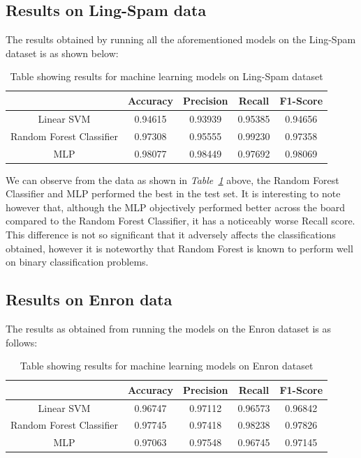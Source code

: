 \documentclass[11pt, a4paper]{article}
\begin{document}
\subsection{Results on Ling-Spam data}

The results obtained by running all the aforementioned models on the Ling-Spam dataset is as shown below:\\
\begin{table}[!h]
\centering
\begin{tabular}{c c c c c}
 & Accuracy & Precision & Recall & F1-Score\\
\hline
Linear SVM & 0.94615 & 0.93939 & 0.95385 & 0.94656\\
\hline 
Random Forest Classifier & 0.97308 & 0.95555 & 0.99230 & 0.97358\\
\hline
MLP & 0.98077 & 0.98449 & 0.97692 & 0.98069\\
\hline
\end{tabular}
\caption{Table showing results for machine learning models on Ling-Spam dataset}
\label{table:lingspam}
\end{table}

We can observe from the data as shown in \emph{Table~\ref{table:lingspam}} above, the Random Forest Classifier and MLP performed the best in the test set. It is interesting to note however that, although the MLP objectively performed better across the board compared to the Random Forest Classifier, it has a noticeably worse Recall score. This difference is not so significant that it adversely affects the classifications obtained, however it is noteworthy that Random Forest is known to perform well on binary classification problems.

\newpage

\subsection{Results on Enron data}

The results as obtained from running the models on the Enron dataset is as follows:\\
\begin{table}[!h]
\centering
\begin{tabular}{c c c c c}
 & Accuracy & Precision & Recall & F1-Score\\
\hline
Linear SVM & 0.96747 & 0.97112 & 0.96573 & 0.96842\\
\hline 
Random Forest Classifier & 0.97745 & 0.97418 & 0.98238 & 0.97826\\
\hline
MLP & 0.97063 & 0.97548 & 0.96745 & 0.97145\\
\hline
\end{tabular}
\caption{Table showing results for machine learning models on Enron dataset}
\label{table:enron}
\end{table}
\end{document}
